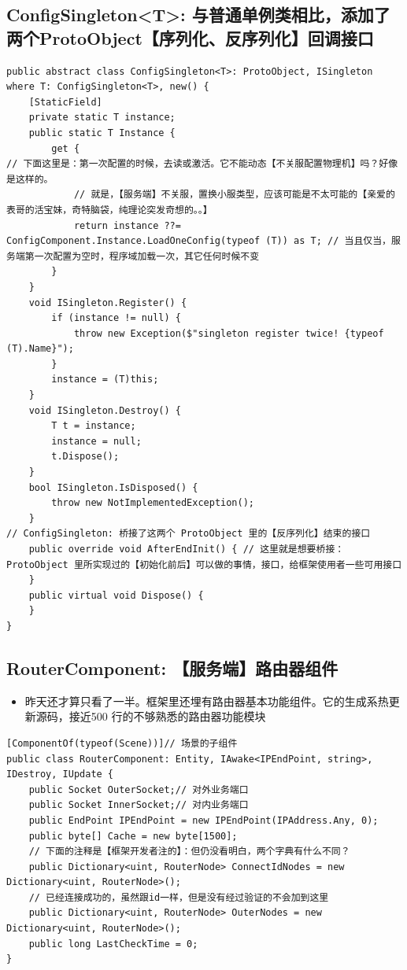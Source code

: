 \documentclass[9pt, b5paper]{article}
\begin{document}
\subsection{ConfigSingleton<T>: 与普通单例类相比，添加了两个ProtoObject【序列化、反序列化】回调接口}
\label{sec-7-6}
\begin{verbatim}
public abstract class ConfigSingleton<T>: ProtoObject, ISingleton where T: ConfigSingleton<T>, new() {
    [StaticField]
    private static T instance;
    public static T Instance {
        get {
// 下面这里是：第一次配置的时候，去读或激活。它不能动态【不关服配置物理机】吗？好像是这样的。
            // 就是，【服务端】不关服，置换小服类型，应该可能是不太可能的【亲爱的表哥的活宝妹，奇特脑袋，纯理论突发奇想的。。】
            return instance ??= ConfigComponent.Instance.LoadOneConfig(typeof (T)) as T; // 当且仅当，服务端第一次配置为空时，程序域加载一次，其它任何时候不变
        }
    }
    void ISingleton.Register() {
        if (instance != null) {
            throw new Exception($"singleton register twice! {typeof (T).Name}");
        }
        instance = (T)this;
    }
    void ISingleton.Destroy() {
        T t = instance;
        instance = null;
        t.Dispose();
    }
    bool ISingleton.IsDisposed() {
        throw new NotImplementedException();
    }
// ConfigSingleton: 桥接了这两个 ProtoObject 里的【反序列化】结束的接口        
    public override void AfterEndInit() { // 这里就是想要桥接：ProtoObject 里所实现过的【初始化前后】可以做的事情，接口，给框架使用者一些可用接口
    }
    public virtual void Dispose() {
    }
}
\end{verbatim}
\subsection{RouterComponent: 【服务端】路由器组件}
\label{sec-7-7}
\begin{itemize}
\item 昨天还才算只看了一半。框架里还埋有路由器基本功能组件。它的生成系热更新源码，接近500 行的不够熟悉的路由器功能模块
\end{itemize}
\begin{verbatim}
[ComponentOf(typeof(Scene))]// 场景的子组件
public class RouterComponent: Entity, IAwake<IPEndPoint, string>, IDestroy, IUpdate {
    public Socket OuterSocket;// 对外业务端口
    public Socket InnerSocket;// 对内业务端口
    public EndPoint IPEndPoint = new IPEndPoint(IPAddress.Any, 0);
    public byte[] Cache = new byte[1500];
    // 下面的注释是【框架开发者注的】：但仍没看明白，两个字典有什么不同？
    public Dictionary<uint, RouterNode> ConnectIdNodes = new Dictionary<uint, RouterNode>();
    // 已经连接成功的，虽然跟id一样，但是没有经过验证的不会加到这里
    public Dictionary<uint, RouterNode> OuterNodes = new Dictionary<uint, RouterNode>();
    public long LastCheckTime = 0;
}
\end{verbatim}
\end{document}
